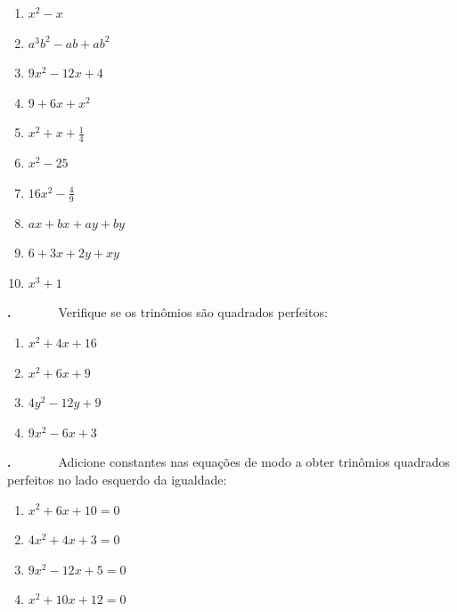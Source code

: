 \begin{multicols}{2}
\begin{enumerate}[label=\alph*)]
\item $x^2-x$

\item $a^3b^2-ab+ab^2$

\item $9x^2-12x+4$

\item $9+6x+x^2$

\item $x^2+x+\frac{1}{4}$

\item $x^2-25$

\item $16x^2-\frac{4}{9}$

\item $ax+bx+ay+by$

\item $6+3x+2y+xy$

\item $x^3+1$
\end{enumerate}
\end{multicols}


\textbf{\thesubsection.\theexercicio ~~~~~~} Verifique se os trinômios são quadrados perfeitos:

\begin{multicols}{2}
\begin{enumerate}[label=\alph*)]
\item $x^2+4x+16$

\item $x^2+6x+9$

\item $4y^2-12y+9$

\item $9x^2-6x+3$
\end{enumerate}
\end{multicols}

\textbf{\thesubsection.\theexercicio ~~~~~~} Adicione constantes nas equações de modo a obter trinômios quadrados perfeitos no lado esquerdo da igualdade:

\begin{multicols}{2}
\begin{enumerate}[label=\alph*)]
\item $x^2 +6x + 10 = 0$

\item $4x^2 +4x + 3 = 0 $

\item $9x^2 - 12x + 5  = 0$

\item $x^2 + 10x + 12  = 0$
\end{enumerate}
\end{multicols}

